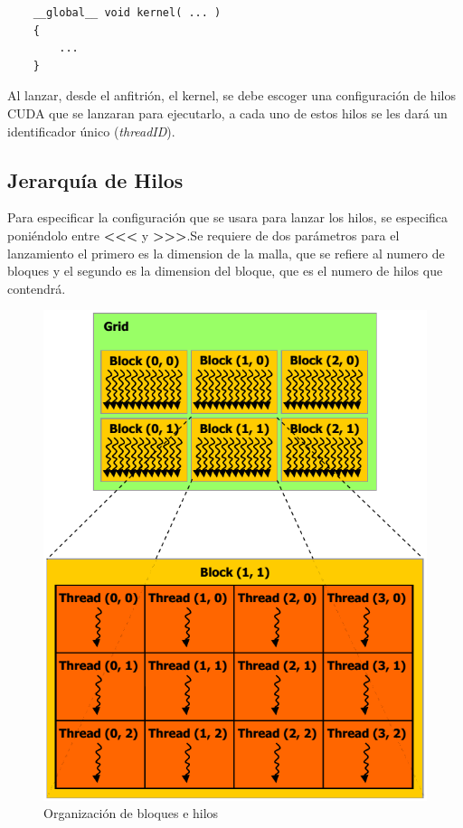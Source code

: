 \begin{lstlisting}
	__global__ void kernel( ... )
    {
   		...
    }

\end{lstlisting}

Al lanzar, desde el anfitrión, el kernel, se debe escoger una configuración de hilos CUDA que se lanzaran para ejecutarlo, a cada uno de estos hilos se les dará un identificador único (\textit{threadID}). 

\subsection{Jerarquía de Hilos}

Para especificar la configuración que se usara para lanzar los hilos, se especifica poniéndolo entre \textbf{\textless\textless\textless} y \textbf{\textgreater\textgreater\textgreater}.Se requiere de dos parámetros para el lanzamiento el primero es la dimension de la malla, que se refiere al numero de bloques y el segundo es la dimension del bloque, que es el numero de hilos que contendrá. 


\begin{figure}[h]
			\centering
				\includegraphics[scale=0.45]{img/grid_block.png}
			\caption{Organización de bloques e hilos}
\end{figure}


